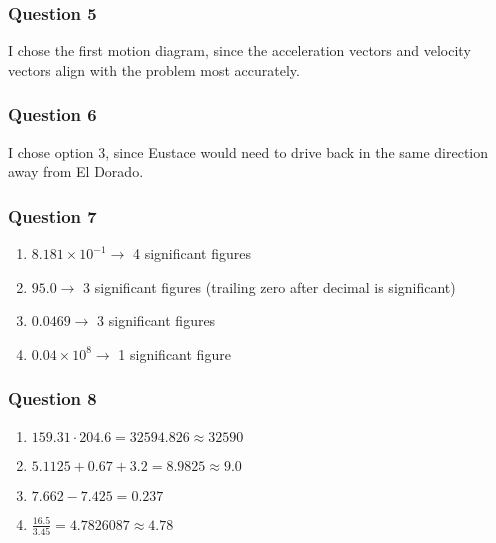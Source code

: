 \subsubsection{Question 5}

\vspace{1em}

\begin{solution}
	I chose the first motion diagram, since the acceleration vectors and velocity vectors align with the problem most accurately.
\end{solution}

\subsubsection{Question 6}

\vspace{1em}

\begin{solution}
	I chose option 3, since Eustace would need to drive back in the same direction away from El Dorado.
\end{solution}

\subsubsection{Question 7}

\vspace{1em}

\begin{solution}
	\begin{enumerate}[label=\Alph*.]
		\item $8.181 \times 10^{-1} \to$ 4 significant figures
		\item $95.0 \to$ 3 significant figures (trailing zero after decimal is significant)
		\item $0.0469 \to$ 3 significant figures
		\item $0.04 \times 10^{8} \to$ 1 significant figure
	\end{enumerate}
\end{solution}

\subsubsection{Question 8}

\vspace{1em}

\begin{solution}
	\begin{enumerate}[label=\Alph*.]
		\item $159.31 \cdot 204.6 = 32594.826 \approx 32590$
		\item $5.1125 + 0.67 + 3.2 = 8.9825 \approx 9.0$
		\item $7.662 - 7.425 = 0.237$
		\item $\frac{16.5}{3.45} = 4.7826087 \approx 4.78$
	\end{enumerate}
\end{solution}

